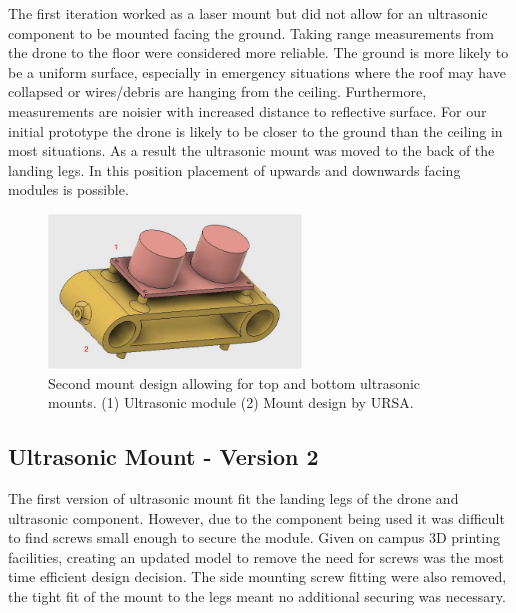 \documentclass[capstone_report.tex]{subfiles}
\begin{document}
The first iteration worked as a laser mount but did not allow for an ultrasonic component to be mounted facing the ground.  Taking range measurements from the drone to the floor were considered more reliable.  The ground is more likely to be a uniform surface, especially in emergency situations where the roof may have collapsed or wires/debris are hanging from the ceiling.  Furthermore, measurements are noisier with increased distance to reflective surface.  For our initial prototype the drone is likely to be closer to the ground than the ceiling in most situations.  As a result the ultrasonic mount was moved to the back of the landing legs.  In this position placement of upwards and downwards facing modules is possible.

\begin{figure}[H]
    \centering
    \includegraphics[width=0.6\textwidth]{imgs/mount2_labelled.png}
    \caption{Second mount design allowing for top and bottom ultrasonic mounts. (1) Ultrasonic module (2) Mount design by URSA.\label{fig:mount2}}
\end{figure}

\subsection{Ultrasonic Mount - Version 2}

The first version of ultrasonic mount fit the landing legs of the drone and ultrasonic component.  However, due to the component being used it was difficult to find screws small enough to secure the module.  Given on campus 3D printing facilities, creating an updated model to remove the need for screws was the most time efficient design decision.  The side mounting screw fitting were also removed, the tight fit of the mount to the legs meant no additional securing was necessary.
\end{document}
